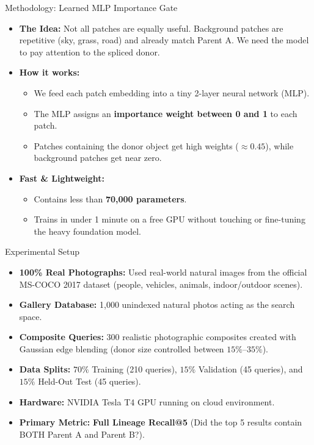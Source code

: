 \documentclass[xcolor=table]{beamer}
\begin{document}
\begin{frame}{Methodology: Learned MLP Importance Gate}
  \begin{itemize}
    \item \textbf{The Idea:} Not all patches are equally useful. Background patches are repetitive (sky, grass, road) and already match Parent A. We need the model to pay attention to the spliced donor.
    \item \textbf{How it works:}
    \begin{itemize}
      \item We feed each patch embedding into a tiny 2-layer neural network (MLP).
      \item The MLP assigns an \textbf{importance weight between 0 and 1} to each patch.
      \item Patches containing the donor object get high weights ($\approx 0.45$), while background patches get near zero.
    \end{itemize}
    \item \textbf{Fast \& Lightweight:}
    \begin{itemize}
      \item Contains less than \textbf{70,000 parameters}.
      \item Trains in under 1 minute on a free GPU without touching or fine-tuning the heavy foundation model.
    \end{itemize}
  \end{itemize}
\end{frame}

\begin{frame}{Experimental Setup}
  \begin{itemize}
    \item \textbf{100\% Real Photographs:} Used real-world natural images from the official MS-COCO 2017 dataset (people, vehicles, animals, indoor/outdoor scenes).
    \item \textbf{Gallery Database:} 1,000 unindexed natural photos acting as the search space.
    \item \textbf{Composite Queries:} 300 realistic photographic composites created with Gaussian edge blending (donor size controlled between $15\%\text{--}35\%$).
    \item \textbf{Data Splits:} $70\%$ Training (210 queries), $15\%$ Validation (45 queries), and $15\%$ Held-Out Test (45 queries).
    \item \textbf{Hardware:} NVIDIA Tesla T4 GPU running on cloud environment.
    \item \textbf{Primary Metric:} \textbf{Full Lineage Recall@5} (Did the top 5 results contain BOTH Parent A and Parent B?).
  \end{itemize}
\end{frame}
\end{document}
